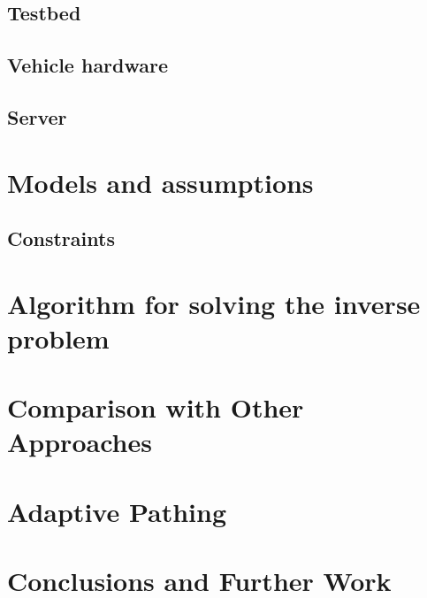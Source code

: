 \documentclass[english]{article}\usepackage[]{graphicx}\usepackage[]{color}
\begin{document}
\subsection{Testbed}
\subsection{Vehicle hardware}
\subsection{Server}
\begin{comment}
Description of testbed, hardware, software, logic
Sid's flowchart
\end{comment}

\section{Models and assumptions}
\subsection{Constraints}
\begin{comment}
Description of constraints for our problem
limited bandwidth, data storage
Also assumptions about simple piecewise environments
\end{comment}

\section{Algorithm for solving the inverse problem}
\begin{comment}
\end{comment}

\section{Comparison with Other Approaches}
\begin{comment}
\end{comment}

\section{Adaptive Pathing}
\begin{comment}
\end{comment}

\section{Conclusions and Further Work}
\end{document}
